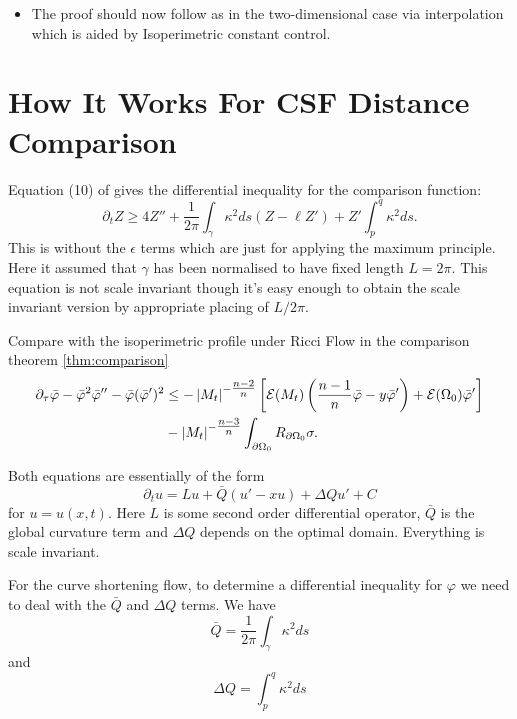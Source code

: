 \documentclass{amsart}
\begin{document}
\begin{itemize}
\item The proof should now follow as in the two-dimensional case via interpolation which is aided by Isoperimetric constant control.
\end{itemize}

\subsection{}

\section{How It Works For CSF Distance Comparison}

Equation (10) of \cite{AndrewsBryan:01/2011} gives the differential inequality for the comparison function:
\[
\partial_t Z \geq 4 Z'' + \frac{1}{2\pi} \int_{\gamma} \kappa^2 ds (Z - \ell Z') + Z'\int_p^q \kappa^2 ds.
\]
This is without the \(\epsilon\) terms which are just for applying the maximum principle. Here it assumed that \(\gamma\) has been normalised to have fixed length \(L = 2\pi\). This equation is not scale invariant though it's easy enough to obtain the scale invariant version by appropriate placing of \(L/2\pi\).

Compare with the isoperimetric profile under Ricci Flow in the comparison theorem \ref{thm:comparison}
\[
\begin{split}
\partial_{\tau} \bar{\varphi} - \bar{\varphi}^2 \bar{\varphi}'' - \bar{\varphi}(\bar{\varphi}')^2 &\leq -\left|{M_t}\right|^{-\tfrac{n-2}{n}} \left[\operatorname{\mathcal{E}}(M_t)\left(\frac{n-1}{n} \bar{\varphi} - y \bar{\varphi}'\right) + \operatorname{\mathcal{E}}(\Omega_0)\bar{\varphi}'\right] \\
&- \left|{M_t}\right|^{-\tfrac{n-3}{n}}\int_{\partial {\Omega_0}} R_{\partial {\Omega_0}}\sigma.
\end{split}
\]

Both equations are essentially of the form
\[
\partial_t u = L u + \bar{Q} (u' - x u) + \Delta Q u' + C
\]
for \(u = u(x, t)\). Here \(L\) is some second order differential operator, \(\bar{Q}\) is the global curvature term and \(\Delta Q\) depends on the optimal domain. Everything is scale invariant.

For the curve shortening flow, to determine a differential inequality for \(\varphi\) we need to deal with the \(\bar{Q}\) and \(\Delta Q\) terms. We have
\[
\bar{Q} = \frac{1}{2\pi}\int_{\gamma} \kappa^2 ds
\]
and
\[
\Delta Q = \int_p^q \kappa^2 ds
\]
\end{document}
